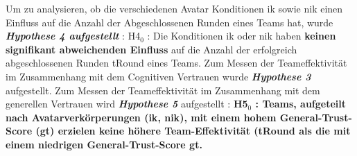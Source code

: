 \documentclass[a4paper,11pt]{article}%
\renewcommand{\\}{\vspace*{0.5\baselineskip} \newline}
\begin{document}
Um zu analysieren, ob die verschiedenen Avatar Konditionen \ac{ik} sowie \ac{nik} einen Einfluss auf die Anzahl der Abgeschlossenen Runden eines Teams hat, wurde \textbf{\textit{Hypothese 4 aufgestellt}} :\\
H4$_{0}$ : Die Konditionen \ac{ik} oder \ac{nik} haben \textbf{keinen signifikant abweichenden Einfluss} auf die Anzahl der erfolgreich abgeschlossenen Runden \ac{tRound} eines Teams.\\
Zum Messen der Teameffektivität im Zusammenhang mit dem Cognitiven Vertrauen wurde \textbf{\textit{Hypothese 3}} aufgestellt. Zum Messen der Teameffektivität im Zusammenhang mit dem generellen Vertrauen wird \textbf{\textit{Hypothese 5}} aufgestellt :
\\
\textbf{H5$_{0}$ : Teams, aufgeteilt nach Avatarverkörperungen (\ac{ik}, \ac{nik}), mit einem hohem General-Trust-Score (\ac{gt}) erzielen \textbf{keine höhere Team-Effektivität} (\ac{tRound} als die mit einem niedrigen General-Trust-Score \ac{gt}.}	
%	
\end{document}
